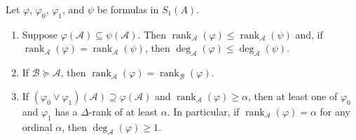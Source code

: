 \documentclass{article}
\DeclareMathOperator{\rank}{rank}
\let\mc\mathcal
\begin{document}
\begin{lemma}\label{pRank}
    Let $\varphi$, $\varphi_0$, $\varphi_1$, and $\psi$ be formulas in $S_1(A)$.
    \begin{enumerate}
        \item Suppose $\varphi(\mc{A}) \subseteq \psi(\mc{A})$. Then $\rank_{\mc{A}}(\varphi) \leq \rank_{\mc{A}}(\psi)$ and, if $\rank_{\mc{A}}(\varphi) = \rank_{\mc{A}}(\psi)$, then $\deg_{\mc{A}}(\varphi) \leq \deg_{\mc{A}}(\psi)$.
        \item If $\mc{B} \succeq \mc{A}$, then $\rank_{\mc{A}}(\varphi) = \rank_{\mc{B}}(\varphi)$.
        \item If $(\varphi_0 \lor \varphi_1)(\mc{A}) \supseteq \varphi(\mc{A})$ and $\rank_{\mc{A}}(\varphi) \geq \alpha$, then at least one of $\varphi_0$ and $\varphi_1$ has a $\Delta$-rank of at least $\alpha$. In particular, if $\rank_{\mc{A}}(\varphi) = \alpha$ for any ordinal $\alpha$, then $\deg_{\mc{A}}(\varphi) \geq 1$.
    \end{enumerate}
\end{lemma}
\end{document}
